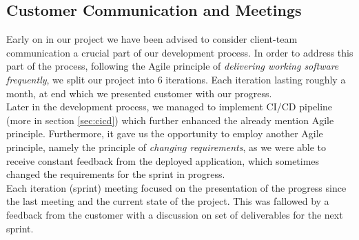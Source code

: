 \documentclass{l3proj}
\begin{document}
    \newpage
    \subsection{Customer Communication and Meetings}
    \label{sec:communication}
        Early on in our project we have been advised to consider client-team communication a crucial part of our development process. In order to address this part of the process, following the Agile principle of \textit{delivering working
        software frequently}\cite{manifesto}, we split our project into 6 iterations. Each iteration lasting roughly a month, at end which we presented customer with our progress.\\
        Later in the development process, we managed to implement CI/CD pipeline (more in section \ref{sec:cicd}) which further enhanced the already mention Agile principle. Furthermore, it gave us the opportunity to employ another Agile principle, namely the principle of \textit{changing requirements}\cite{manifesto}, as we were able to receive constant feedback from the deployed application, which sometimes changed the requirements for the sprint in progress.\\
        \newline
        Each iteration (sprint) meeting focused on the presentation of the progress since the last meeting and the current state of the project. This was fallowed by a feedback from the customer with a discussion on set of deliverables for the next sprint.
        
\end{document}
